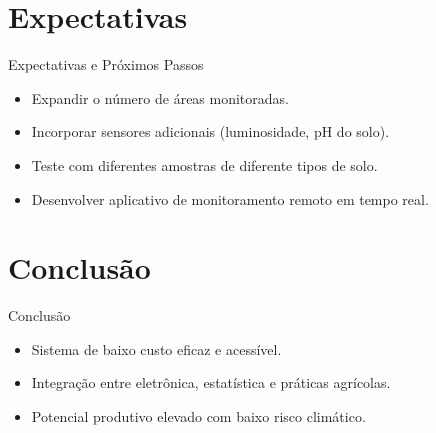 \documentclass{beamer}
\begin{document}
\section{Expectativas}
\begin{frame}{Expectativas e Próximos Passos}
\begin{itemize}
    \item Expandir o número de áreas monitoradas.
    \item Incorporar sensores adicionais (luminosidade, pH do solo).
    \item Teste com diferentes amostras de diferente tipos de solo.
    \item Desenvolver aplicativo de monitoramento remoto em tempo real.
\end{itemize}
\end{frame}


\section{Conclusão}
\begin{frame}{Conclusão}
\begin{itemize}
    \item Sistema de baixo custo eficaz e acessível.
    \item Integração entre eletrônica, estatística e práticas agrícolas.
    \item Potencial produtivo elevado com baixo risco climático.
\end{itemize}
\end{frame}
\end{document}
